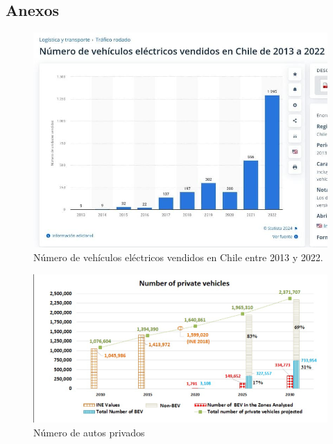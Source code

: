 \documentclass[letterpaper]{article}
\begin{document}
\begin{flushleft}
	\section{Anexos}
	\begin{figure}[htbp]
		\centering
		\includegraphics[scale=0.4]{grafica-1}
		\caption{Número de vehículos eléctricos vendidos en Chile entre 2013 y 2022. \cite{statista}}
		\label{fig:grafica1}
	\end{figure}

	\begin{figure}[htbp]
		\centering
		\includegraphics[scale=0.5]{grafica-2}
		\caption{Número de autos privados \cite{paredes}}
		\label{fig:grafica2}
	\end{figure}

\end{flushleft}
\end{document}
